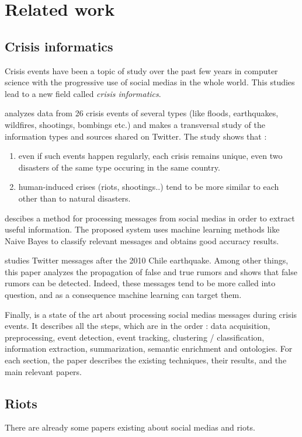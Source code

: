 \documentclass[a4paper,twoside,12pt,openright]{report}
\begin{document}
\chapter{Related work}
\section{Crisis informatics}
Crisis events have been a topic of study over the past few years in computer science with the progressive use of social medias in the whole world. This studies lead to a new field called \emph{crisis informatics}.

\cite{vieweg2015expect} analyzes data from 26 crisis events of several types (like floods, earthquakes, wildfires, shootings, bombings etc.) and makes a transversal study of the information types and sources shared on Twitter. The study shows that :
\begin{enumerate}
\item even if such events happen regularly, each crisis remains unique, even two disasters of the same type occuring in the same country.
\item human-induced crises (riots, shootings..) tend to be more similar to each other than to natural disasters.
\end{enumerate}

\cite{imran2013extracting} descibes a method for processing messages from social medias in order to extract useful information. The proposed system uses machine learning methods like Naive Bayes to classify relevant messages and obtains good accuracy results.

\cite{mendoza2010twitter} studies Twitter messages after the 2010 Chile earthquake. Among other things, this paper analyzes the propagation of false and true rumors and shows that false rumors can be detected. Indeed, these messages tend to be more called into question, and as a consequence machine learning can target them.

Finally, \cite{imran2014processing} is a state of the art about processing social medias messages during crisis events. It describes all the steps, which are in the order : data acquisition, preprocessing, event detection, event tracking, clustering / classification, information extraction, summarization, semantic enrichment and ontologies. For each section, the paper describes the existing techniques, their results, and the main relevant papers.
\newpage
\section{Riots}
There are already some papers existing about social medias and riots.
\end{document}
